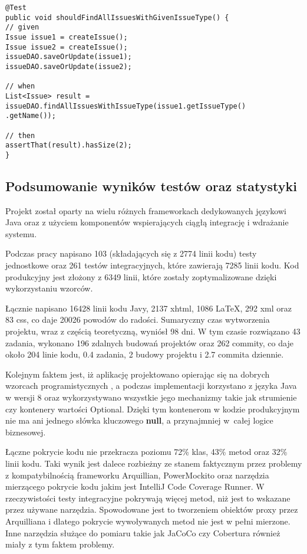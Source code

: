 \begin{lstlisting}[caption={Przykład testu integracyjnego}, label=lis:integ, numbers=none]
@Test
public void shouldFindAllIssuesWithGivenIssueType() {
// given
Issue issue1 = createIssue();
Issue issue2 = createIssue();
issueDAO.saveOrUpdate(issue1);
issueDAO.saveOrUpdate(issue2);

// when
List<Issue> result = issueDAO.findAllIssuesWithIssueType(issue1.getIssueType()
.getName());

// then
assertThat(result).hasSize(2);
}\end{lstlisting}


\subsection{Podsumowanie wyników testów oraz statystyki}
Projekt został oparty na wielu różnych frameworkach dedykowanych językowi Java oraz z użyciem komponentów wspierających ciągłą integrację i wdrażanie systemu.

Podczas pracy napisano 103 (składających się z 2774 linii kodu) testy jednostkowe oraz 261 testów integracyjnych, które zawierają 7285 linii kodu. Kod produkcyjny jest złożony z 6349 linii, które zostały zoptymalizowane dzięki wykorzystaniu wzorców. 

Łącznie napisano 16428 linii kodu Javy, 2137 xhtml, 1086 \LaTeX, 292 xml oraz 83 css, co daje 20026 powodów do radości.  Sumaryczny czas wytworzenia projektu, wraz z częścią teoretyczną, wyniósł 98 dni. W tym czasie rozwiązano 43 zadania, wykonano 196 zdalnych budowań projektów oraz 262 commity, co daje około 204 linie kodu, 0.4 zadania, 2 budowy projektu i 2.7 commita dziennie.

Kolejnym faktem jest, iż aplikację projektowano opierając się na dobrych wzorcach programistycznych \cite{CLEAN_CODE}\cite{REFACTOR}\cite{CI}, a podczas implementacji korzystano z języka Java w wersji 8 oraz wykorzystywano wszystkie jego mechanizmy takie jak strumienie czy kontenery wartości Optional. Dzięki tym kontenerom w kodzie produkcyjnym nie ma ani jednego słówka kluczowego \textbf{null}, a przynajmniej w~całej logice biznesowej.

Łączne pokrycie kodu nie przekracza poziomu 72\% klas, 43\% metod oraz 32\% linii kodu. Taki wynik jest dalece rozbieżny ze stanem faktycznym przez problemy z kompatybilnością frameworku Arquillian, PowerMockito oraz narzędzia mierzącego pokrycie kodu jakim jest IntelliJ Code Coverage Runner. W rzeczywistości testy integracyjne pokrywają więcej metod, niż jest to wskazane przez używane narzędzia. Spowodowane jest to tworzeniem obiektów proxy przez Arquilliana i dlatego pokrycie wywoływanych metod nie jest w pełni mierzone. Inne narzędzia służące do pomiaru takie jak JaCoCo czy Cobertura również miały z tym faktem problemy.
